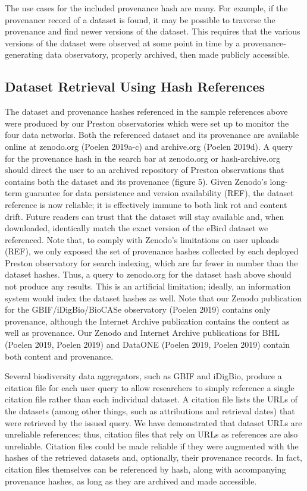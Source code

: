 \documentclass[10pt,letterpaper]{article}
\begin{document}
 The use cases for the included provenance hash are many. For example, if the provenance record of a dataset is found, it may be possible to traverse the provenance and find newer versions of the dataset. This requires that the various versions of the dataset were observed at some point in time by a provenance-generating data observatory, properly archived, then made publicly accessible.

\subsection*{Dataset Retrieval Using Hash References}

The dataset and provenance hashes referenced in the sample references above were produced by our Preston observatories which were set up to monitor the four data networks. Both the referenced dataset and its provenance are available online at zenodo.org (Poelen 2019a-c) and archive.org (Poelen 2019d). A query for the provenance hash in the search bar at zenodo.org or hash-archive.org should direct the user to an archived repository of Preston observations that contains both the dataset and its provenance (figure 5). Given Zenodo’s long-term guarantee for data persistence and version availability (REF), the dataset reference is now reliable; it is effectively immune to both link rot and content drift. Future readers can trust that the dataset will stay available and, when downloaded, identically match the exact version of the eBird dataset we referenced. Note that, to comply with Zenodo’s limitations on user uploads (REF), we only exposed the set of provenance hashes collected by each deployed Preston observatory for search indexing, which are far fewer in number than the dataset hashes. Thus, a query to zenodo.org for the dataset hash above should not produce any results. This is an artificial limitation; ideally, an information system would index the dataset hashes as well. Note that our Zenodo publication for the GBIF/iDigBio/BioCASe observatory (Poelen 2019) contains only provenance, although the Internet Archive publication contains the content as well as provenance. Our Zenodo and Internet Archive publications for BHL (Poelen 2019, Poelen 2019) and DataONE (Poelen 2019, Poelen 2019) contain both content and provenance.

Several biodiversity data aggregators, such as GBIF and iDigBio, produce a citation file for each user query to allow researchers to simply reference a single citation file rather than each individual dataset. A citation file lists the URLs of the datasets (among other things, such as attributions and retrieval dates) that were retrieved by the issued query. We have demonstrated that dataset URLs are unreliable references; thus, citation files that rely on URLs as references are also unreliable. Citation files could be made reliable if they were augmented with the hashes of the retrieved datasets and, optionally, their provenance records. In fact, citation files themselves can be referenced by hash, along with accompanying provenance hashes, as long as they are archived and made accessible.
\end{document}
